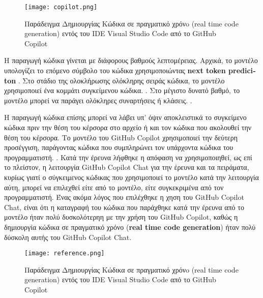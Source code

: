 \begin{figure}[H]
  \begin{center}
    \texttt{[image: copilot.png]}
    \label{fig:codeGen}
    \caption{Παράδειγμα Δημιουργίας Κώδικα σε πραγματικό χρόνo \textlatin{(real time code generation)} εντός του \textlatin{IDE} \textlatin{Visual Studio Code} από το \textlatin{GitHub Copilot } }
  \end{center}
\end{figure}


H παραγωγή κώδικα γίνεται με διάφορους βαθμούς λεπτομέρειας. Αρχικά, το μοντέλο υπολογίζει το επόμενο σύμβολο του κώδικα χρησιμοποιώντας \textlatin{\textbf{next token prediciton}} \cite{Izadi2022,Kim2021,Wang2021,Feng2020,Ciniselli2021b,Ciniselli2021a}. Στο στάδιο της ολοκλήρωσης ολόκληρης σειράς κώδικα, το μοντέλο χρησιμοποιεί ένα κομμάτι συγκείμενου κώδικα. \cite{Izadi2022,Guo2022,Svyatkovskiy2020,Lu2021}. Στο μέγιστο δυνατό βαθμό, το μοντέλο μπορεί να παράγει ολόκληρες συναρτήσεις ή κλάσεις. \cite{fried2023incoder,Guo2022,githubcopilot}.

Η παραγωγή κώδικα επίσης μπορεί να λάβει υπ' όψιν αποκλειστικά το συγκείμενο κώδικα πριν την θέση του κέρσορα στο αρχείο ή και τον κώδικα που ακολουθεί την θέση του κέρσορα. \cite{izadi2024language} Το μοντέλο του \textlatin{GitHub Copilot} χρησιμοποιεί την δεύτερη προσέγγιση, παράγοντας κώδικα που συμπληρώνει τον υπάρχοντα κώδικα του προγραμματιστή. \cite{githubcopilot,fried2023incoder, wang2021codet5}. Κατά την έρευνα λήφθηκε η απόφαση να χρησιμοποιηθεί, ως επί το πλείστον, η λειτουργία \textlatin{GitHub Copilot Chat} για την έρευνα και τα πειράματα, κυρίως γιατί ο σύγκειμενος κώδικας που χρησιμοποιεί το μοντέλο κατά την λειτουργία αύτη, μπορεί να επιλεχθεί είτε από το μοντέλο, είτε συγκεκριμένα από τον προγραμματιστή. Ένας ακόμα λόγος που επιλέχθηκε η χηση του \textlatin{GitHub Copilot Chat}, είναι ότι η καταγραφή του κώδικα που παράχθηκε κατά την έρευνα από το μοντέλο ήταν πολύ δυσκολότερηη με την χρήση του \textlatin{GitHub Copilot}, καθώς η δημιουργία κώδικα σε πραγματικό χρόνο \textlatin{(\textbf{real time code generation})} ήταν πολύ δύσκολη αυτής του \textlatin{GitHub Copilot Chat}.

\begin{figure}[H]
  \begin{center}
    \texttt{[image: reference.png]}
    \label{fig:reference}
    \caption{Παράδειγμα Δημιουργίας Κώδικα σε πραγματικό χρόνo \textlatin{(real time code generation)} εντός του \textlatin{IDE} \textlatin{Visual Studio Code} από το \textlatin{GitHub Copilot } }
  \end{center}
\end{figure}


